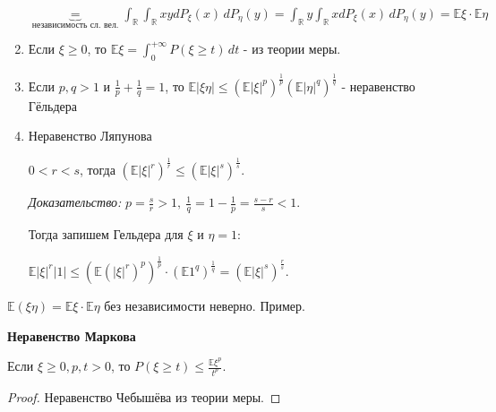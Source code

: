 \begin{properties}
\begin{enumerate}
{            $\underbrace{=}_{\text{независимость сл. вел.}} \int_{\mathbb{R}} \int_{\mathbb{R}} xy dP_{\xi} (x) \, dP_{\eta} (y) =
            \int_{\mathbb{R}} y \int_{\mathbb{R}} x dP_{\xi} (x) \, dP_{\eta} (y) = \mathbb{E} \xi \cdot \mathbb{E} \eta$
        }
        \item {
            Если $\xi \geqslant 0$, то $\mathbb{E} \xi = \int_{0}^{+\infty} P(\xi \geqslant t) \, dt$ - из теории меры.
        }
        \item {
            Если $p, q > 1$ и $\frac{1}{p} + \frac{1}{q} = 1$, то $\mathbb{E}|\xi \eta| \leqslant (\mathbb{E}|\xi|^p)^{\frac{1}{p}} (\mathbb{E} |\eta|^q)^{\frac{1}{q}}$ - 
            неравенство Гёльдера
        }
        \item {
            Неравенство Ляпунова

            $0 < r < s$, тогда $(\mathbb{E} |\xi| ^ r)^{\frac{1}{r}} \leqslant (\mathbb{E}|\xi|^s)^{\frac{1}{s}}$.

            \textit{Доказательство:} $p = \frac{s}{r} > 1, \ \frac{1}{q} = 1 - \frac{1}{p} = \frac{s - r}{s} < 1$.

            Тогда запишем Гельдера для $\xi$ и $\eta = 1$:
            
            $\mathbb{E} |\xi|^r |1| \leq \left(\mathbb{E} (|\xi|^r)^p \right)^{\frac{1}{p}} \cdot \left( \mathbb{E} 1^q \right)^{\frac{1}{q}} = \left( \mathbb{E} |\xi|^s \right)^{\frac{r}{s}}$.
            

        }
    \end{enumerate}
\end{properties}

\begin{remark}
    $\mathbb{E}(\xi \eta) = \mathbb{E}\xi \cdot \mathbb{E} \eta$ без независимости неверно.
    Пример.
\end{remark}

\begin{theorem}
    \textbf{Неравенство Маркова}

    Если $\xi \geqslant 0, p, t > 0$, то $P(\xi \geqslant t) \leqslant \frac{\mathbb{E}\xi^p}{t^p}$.
\end{theorem}

\begin{proof}
    Неравенство Чебышёва из теории меры.
\end{proof}

